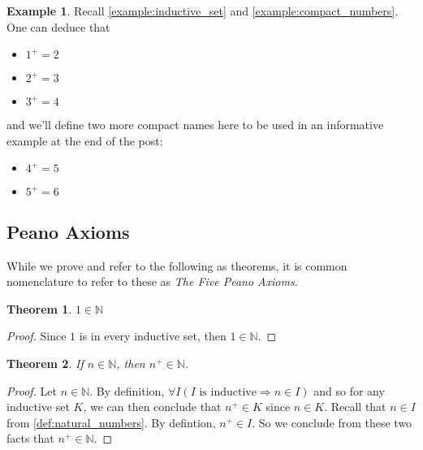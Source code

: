 \documentclass{article}
\theoremstyle{definition}
\theoremstyle{definition}
\newtheorem{example}{Example}[section]
\theoremstyle{plain}
\theoremstyle{remark}
\theoremstyle{plain}
\newtheorem{theorem}{Theorem}[section]
\theoremstyle{remark}
\theoremstyle{plain}
\theoremstyle{plain}
\theoremstyle{plain}
\theoremstyle{plain}
\begin{document}
\begin{example}
  Recall \autoref{example:inductive_set} and \autoref{example:compact_numbers}. 
  One can deduce that 
  \begin{itemize}
    \item \(1^{+} = 2 \)
    \item \(2^{+} = 3\)
    \item \(3^{+} = 4\)
  \end{itemize}
  and we'll define two more compact names here to be used in an informative 
  example at the end of the post: 
  \begin{itemize}
    \item \(4^{+} = 5\)
    \item \(5^{+} = 6\)
  \end{itemize}
  \label{example:successor}
\end{example}

\subsection{Peano Axioms}

While we prove and refer to the following as theorems, it is common nomenclature 
to refer to these as \textit{The Five Peano Axioms}.

\begin{theorem}
  \( 1 \in \mathbb{N} \)
  \label{thm:first_peano_axiom}
\end{theorem}

\begin{proof}
  Since \( 1 \) is in every inductive set, then \( 1 \in \mathbb{N} \).
\end{proof}

\begin{theorem}
  If \( n \in \mathbb{N} \), then \( n^{+} \in \mathbb{N} \).
  \label{thm:second_peano_axiom}
\end{theorem}

\begin{proof}
  Let \( n \in \mathbb{N} \). By definition, 
  \( \forall I ( I \text{ is inductive} \Rightarrow n \in I ) \) and so
  for any inductive set \(K\), we can then conclude that \( n^{+} \in K \) since
  \( n \in K \). 
  Recall that \( n \in I \) from \autoref{def:natural_numbers}. By defintion, 
  \( n^{+} \in I \). So we conclude from these two facts that 
  \( n^{+} \in \mathbb{N} \).
\end{proof}

\newpage
\end{document}
